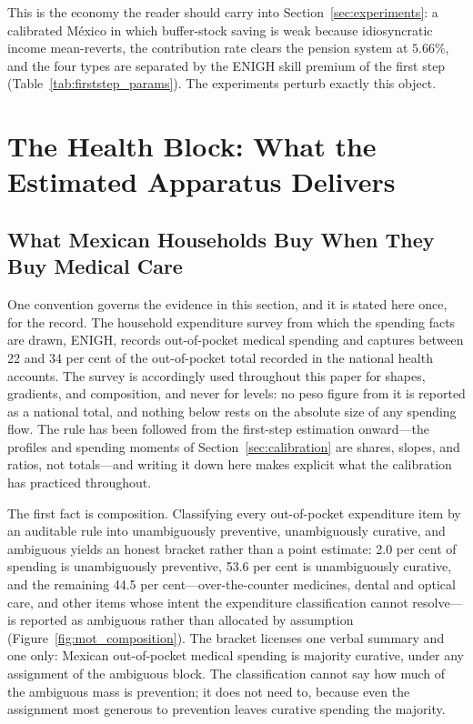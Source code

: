 \documentclass[12pt,a4paper]{article}
\begin{document}
This is the economy the reader should carry into Section~\ref{sec:experiments}: a calibrated M\'exico in which buffer-stock saving is weak because idiosyncratic income mean-reverts, the contribution rate clears the pension system at $5.66\%$, and the four types are separated by the ENIGH skill premium of the first step (Table~\ref{tab:firststep_params}). The experiments perturb exactly this object.


\section{The Health Block: What the Estimated Apparatus Delivers}
\label{sec:healthblock}

\subsection{What Mexican Households Buy When They Buy Medical Care}
\label{subsec:health_evidence}

One convention governs the evidence in this section, and it is stated here once, for the record. The household expenditure survey from which the spending facts are drawn, ENIGH, records out-of-pocket medical spending and captures between 22 and 34 per cent of the out-of-pocket total recorded in the national health accounts. The survey is accordingly used throughout this paper for shapes, gradients, and composition, and never for levels: no peso figure from it is reported as a national total, and nothing below rests on the absolute size of any spending flow. The rule has been followed from the first-step estimation onward---the profiles and spending moments of Section~\ref{sec:calibration} are shares, slopes, and ratios, not totals---and writing it down here makes explicit what the calibration has practiced throughout.

The first fact is composition. Classifying every out-of-pocket expenditure item by an auditable rule into unambiguously preventive, unambiguously curative, and ambiguous yields an honest bracket rather than a point estimate: 2.0 per cent of spending is unambiguously preventive, 53.6 per cent is unambiguously curative, and the remaining 44.5 per cent---over-the-counter medicines, dental and optical care, and other items whose intent the expenditure classification cannot resolve---is reported as ambiguous rather than allocated by assumption (Figure~\ref{fig:mot_composition}). The bracket licenses one verbal summary and one only: Mexican out-of-pocket medical spending is majority curative, under any assignment of the ambiguous block. The classification cannot say how much of the ambiguous mass is prevention; it does not need to, because even the assignment most generous to prevention leaves curative spending the majority.
\end{document}
